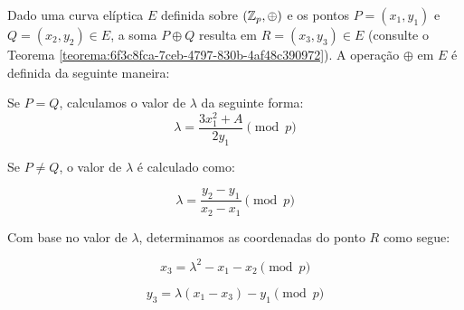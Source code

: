 \begin{definicao} \label{definicao:38fb565b-5356-485a-bc23-f1d31dcd0f8f}
	Dado uma curva elíptica $E$ definida sobre $(\mathbb{Z}_p, \oplus)$ e os pontos $P =
		(x_1, y_1)$ e $Q = (x_2, y_2) \in E$, a soma $P \oplus Q$ resulta em $R = (x_3,
		y_3) \in E$ (consulte o Teorema
	\ref{teorema:6f3c8fca-7ceb-4797-830b-4af48c390972}). A operação $\oplus$ em $E$
	é definida da seguinte maneira:

	Se $P = Q$, calculamos o valor de $\lambda$ da seguinte forma:
	\begin{equation}
		\lambda = \frac{3x_1^2 + A}{2y_1} \pmod{p} \label{equation:6c395b0c-263e-48b1-bb81-69e261534d1b}
	\end{equation}

	Se $P \neq Q$, o valor de $\lambda$ é calculado como:

	\begin{equation}
		\lambda = \frac{y_2 - y_1}{x_2 - x_1} \pmod{p} \label{equation:a3d20958-5111-4874-9793-b9a714f013aa}
	\end{equation}

	Com base no valor de $\lambda$, determinamos as coordenadas do ponto $R$ como
	segue:

	\begin{equation}
		x_3 = \lambda^2 - x_1 - x_2 \pmod{p} \label{equation:da9ad657-8ab7-421d-a202-0cf463d28920}
	\end{equation}

	\begin{equation}
		y_3 = \lambda(x_1 - x_3) - y_1 \pmod{p} \label{equation:8c03bda8-df85-4e46-97f5-18acd9cb0a31}
	\end{equation}

\end{definicao}

